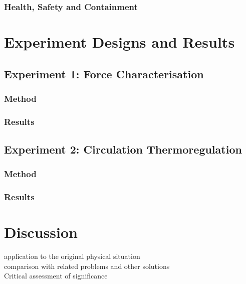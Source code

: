 \documentclass[a4paper,12pt]{article}
\begin{document}
\subsubsection{Health, Safety and Containment}

\newpage

\section{Experiment Designs and Results}

\subsection{Experiment 1: Force Characterisation}

\subsubsection{Method}

\subsubsection{Results}

\subsection{Experiment 2: Circulation Thermoregulation}

\subsubsection{Method}

\subsubsection{Results}

\newpage

\section{Discussion}

application to the original physical situation\\ 

comparison with related problems and other solutions\\

Critical assessment of significance\\
\end{document}
